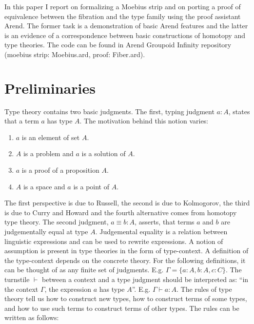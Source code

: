 In this paper I report on formalizing a Moebius strip and on porting a proof of equivalence between the fibration and the type family using the proof assistant Arend. The former task is a demonstration of basic Arend features and the latter is an evidence of a correspondence between basic constructions of homotopy and type theories. The code can be found in Arend Groupoid Infinity repository (moebius strip: Moebius.ard\autocite{Moebius}, proof: Fiber.ard\autocite{Fiber}).

\section{Preliminaries}

Type theory contains two basic judgments. The first, typing judgment $a : A$, states that a term $a$ has type $A$. The motivation behind this notion varies:
\begin{enumerate}
	\item $a$ is an element of set $A$.
	\item $A$ is a problem and $a$ is a solution of $A$.
	\item $a$ is a proof of a proposition $A$.
	\item $A$ is a space and $a$ is a point of $A$.
\end{enumerate}
The first perspective is due to Russell, the second is due to Kolmogorov, the third is due to Curry and Howard and the fourth alternative comes from homotopy type theory\autocite{Warren1}. 
The second judgment, $a \equiv b : A$, asserts, that terms $a$ and $b$ are judgementally equal at type $A$. Judgemental equality is a relation between linguistic expressions and can be used to rewrite expressions\autocite{hottbook}. A notion of assumption is present in type theories in the form of type-context.
A definition of the type-context depends on the concrete theory. For the following definitions, it can be thought of as any finite set of judgments. E.g. $\Gamma = \{a : A, b : A, c : C\}$. The turnstile $\vdash$ between a context and a type judgment should be interpreted as: ``in the context $\Gamma$, the expression $a$ has type $A$''. E.g. $\Gamma \vdash a : A$. The rules of type theory tell us how to construct new types, how to construct terms of some types, and how to use such terms to construct terms of other types. The rules can be written as follows:
\begin{prooftree}
\end{prooftree}
